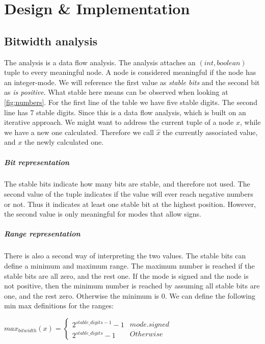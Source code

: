 \chapter{Design \& Implementation}\label{sec:impl}

\section{Bitwidth analysis}
The analysis is a data flow analysis. The analysis attaches an $(int,boolean)$ tuple to every meaningful node. A node is considered meaningful if the node has an integer-mode. We will reference the first value as \emph{stable bits} and the second bit as \emph{is positive}. \newline
What stable here means can be observed when looking at \ref{fig:numbers}.
For the first line of the table we have five stable digits. The second line has 7 stable digits.\newline
Since this is a data flow analysis, which is built on an iterative approach. We might want to address the current tuple of a node $x$, while we have a new one calculated. Therefore we call $\hat{x}$ the currently associated value, and $x$ the newly calculated one.

\paragraph{Bit representation}
The stable bits indicate how many bits are stable, and therefore not used.
The second value of the tuple indicates if the value will ever reach negative numbers or not. Thus it indicates at least one stable bit at the highest position. However, the second value is only meaningful for modes that allow signs.

\paragraph{Range representation}
There is also a second way of interpreting the two values. The stable bits can define a minimum and maximum range. The maximum number is reached if the stable bits are all zero, and the rest one. If the mode is signed and the node is not positive, then the minimum number is reached by assuming all stable bits are one, and the rest zero. Otherwise the minimum is 0. We can define the following min max definitions for the ranges:

$
max_{bitwidth}(x)=
\left\{
\begin{array}{l}2^{stable\_digits-1}-1\\2^{stable\_digits}-1\end{array}
\begin{array}{l} {mode.signed} \\ {Otherwise} \end{array}
\right.
$

